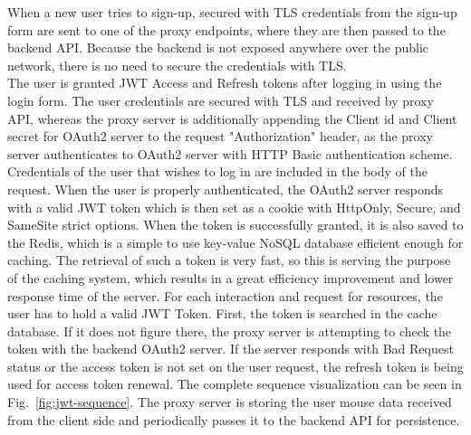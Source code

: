 When a new user tries to sign-up, secured with TLS credentials from the sign-up form are sent to one of the proxy endpoints, where they are then passed to the backend API.
Because the backend is not exposed anywhere over the public network, there is no need to secure the credentials with TLS.\\
The user is granted JWT Access and Refresh tokens after logging in using the login form.
The user credentials are secured with TLS and received by proxy API, whereas the proxy server is additionally appending the Client id and Client secret for OAuth2 server to the request "Authorization" header, as the proxy server authenticates to OAuth2 server with HTTP Basic authentication scheme.
Credentials of the user that wishes to log in are included in the body of the request.
When the user is properly authenticated, the OAuth2 server responds with a valid JWT token which is then set as a cookie with HttpOnly, Secure, and SameSite strict options.
When the token is successfully granted, it is also saved to the Redis, which is a simple to use key-value NoSQL database efficient enough for caching.
The retrieval of such a token is very fast, so this is serving the purpose of the caching system, which results in a great efficiency improvement and lower response time of the server.
For each interaction and request for resources, the user has to hold a valid JWT Token.
First, the token is searched in the cache database.
If it does not figure there, the proxy server is attempting to check the token with the backend OAuth2 server.
If the server responds with Bad Request status or the access token is not set on the user request, the refresh token is being used for access token renewal.
The complete sequence visualization can be seen in \mbox{Fig.~\ref{fig:jwt-sequence}}.
The proxy server is storing the user mouse data received from the client side and periodically passes it to the backend API for persistence.




